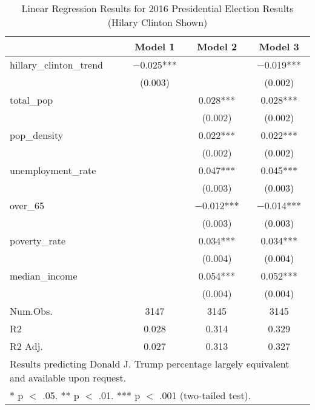 \begin{table}[!h]

\caption{\label{tab:pres_2016_analysis}Linear Regression Results for 2016 Presidential Election Results (Hilary Clinton Shown)}
\centering
\fontsize{8}{10}\selectfont

\begin{tabular}{lccc}
\toprule
  & Model 1 & Model 2 & Model 3\\
\midrule

hillary\_clinton\_trend & \num{-0.025}*** &  & \num{-0.019}***\\
 & (\num{0.003}) &  & (\num{0.002})\\
total\_pop &  & \num{0.028}*** & \num{0.028}***\\
 &  & (\num{0.002}) & \vphantom{1} (\num{0.002})\\
pop\_density &  & \num{0.022}*** & \num{0.022}***\\
 &  & (\num{0.002}) & (\num{0.002})\\
unemployment\_rate &  & \num{0.047}*** & \num{0.045}***\\
 &  & (\num{0.003}) & \vphantom{1} (\num{0.003})\\
over\_65 &  & \num{-0.012}*** & \num{-0.014}***\\
 &  & (\num{0.003}) & (\num{0.003})\\
poverty\_rate &  & \num{0.034}*** & \num{0.034}***\\
 &  & (\num{0.004}) & \vphantom{1} (\num{0.004})\\
median\_income &  & \num{0.054}*** & \num{0.052}***\\
 &  & (\num{0.004}) & (\num{0.004})\\
\midrule
Num.Obs. & \num{3147} & \num{3145} & \num{3145}\\
R2 & \num{0.028} & \num{0.314} & \num{0.329}\\
R2 Adj. & \num{0.027} & \num{0.313} & \num{0.327}\\
\bottomrule
\multicolumn{4}{l}{\rule{0pt}{1em}Results predicting Donald J. Trump percentage largely equivalent and available upon request.}\\
\multicolumn{4}{l}{\rule{0pt}{1em}* p $<$ .05. ** p $<$ .01. *** p $<$ .001 (two-tailed test).}\\
\end{tabular}
\end{table}